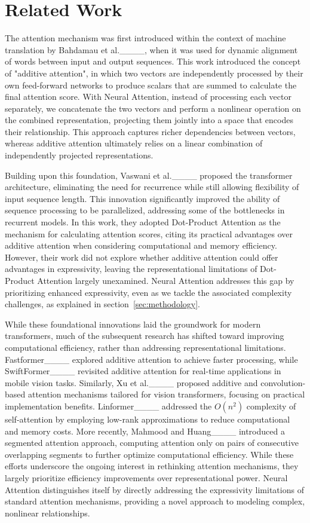 \section{Related Work}
\label{sec:related_work}
The attention mechanism was first introduced within the context of machine translation by Bahdamau et al.____, when it was used for dynamic alignment of words between input and output sequences. This work introduced the concept of "additive attention", in which two vectors are independently processed by their own feed-forward networks to produce scalars that are summed to calculate the final attention score. With Neural Attention, instead of processing each vector separately, we concatenate the two vectors and perform a nonlinear operation on the combined representation, projecting them jointly into a space that encodes their relationship. This approach captures richer dependencies between vectors, whereas additive attention ultimately relies on a linear combination of independently projected representations.

Building upon this foundation, Vaswani et al.____ proposed the transformer architecture, eliminating the need for recurrence while still allowing flexibility of input sequence length. This innovation significantly improved the ability of sequence processing to be parallelized, addressing some of the bottlenecks in recurrent models. In this work, they adopted Dot-Product Attention as the mechanism for calculating attention scores, citing its practical advantages over additive attention when considering computational and memory efficiency. However, their work did not explore whether additive attention could offer advantages in expressivity, leaving the representational limitations of Dot-Product Attention largely unexamined. Neural Attention addresses this gap by prioritizing enhanced expressivity, even as we tackle the associated complexity challenges, as explained in section~\ref{sec:methodology}.

While these foundational innovations laid the groundwork for modern transformers, much of the subsequent research has shifted toward improving computational efficiency, rather than addressing representational limitations. Fastformer____ explored additive attention to achieve faster processing, while SwiftFormer____ revisited additive attention for real-time applications in mobile vision tasks. Similarly, Xu et al.____ proposed additive and convolution-based attention mechanisms tailored for vision transformers, focusing on practical implementation benefits. Linformer____ addressed the $O(n^2)$ complexity of self-attention by employing low-rank approximations to reduce computational and memory costs. More recently, Mahmood and Huang____ introduced a segmented attention approach, computing attention only on pairs of consecutive overlapping segments to further optimize computational efficiency. While these efforts underscore the ongoing interest in rethinking attention mechanisms, they largely prioritize efficiency improvements over representational power. Neural Attention distinguishes itself by directly addressing the expressivity limitations of standard attention mechanisms, providing a novel approach to modeling complex, nonlinear relationships. 

